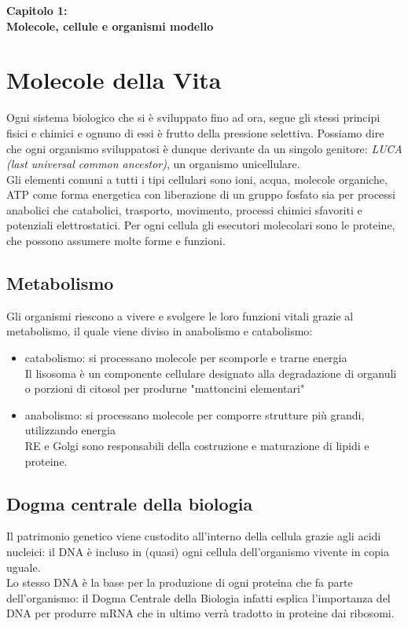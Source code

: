 \Huge\textbf{Capitolo 1: \\Molecole, cellule e organismi modello}


\section{Molecole della Vita}
    \small
    Ogni sistema biologico che si è sviluppato fino ad ora, segue gli stessi principi fisici e chimici e ognuno di essi è frutto della pressione selettiva. 
    Possiamo dire che ogni organismo sviluppatosi è dunque derivante da un singolo genitore: \textit{LUCA (last universal common ancestor)}, un organismo unicellulare.\\
    Gli elementi comuni a tutti i tipi cellulari sono ioni, acqua, molecole organiche, ATP come forma energetica con liberazione di un gruppo fosfato sia per processi anabolici che catabolici, trasporto, movimento, processi chimici sfavoriti e potenziali elettrostatici.
    Per ogni cellula gli esecutori molecolari sono le proteine, che possono assumere molte forme e funzioni. 
    \subsection{Metabolismo}
        \small
        Gli organismi riescono a vivere e svolgere le loro funzioni vitali grazie al metabolismo, il quale viene diviso in anabolismo e catabolismo:
        \begin{itemize}
            \item catabolismo: si processano molecole per scomporle e trarne energia\\
            Il lisosoma è un componente cellulare designato alla degradazione di organuli o porzioni di citosol per produrne "mattoncini elementari"
            \item anabolismo: si processano molecole per comporre strutture più grandi, utilizzando energia\\
            RE e Golgi sono responsabili della costruzione e maturazione di lipidi e proteine.
        \end{itemize}
    
    \subsection{Dogma centrale della biologia}
        \small
        Il patrimonio genetico viene custodito all'interno della cellula grazie agli acidi nucleici: il DNA è incluso in (quasi) ogni cellula dell'organismo vivente in copia uguale. \\
        Lo stesso DNA è la base per la produzione di ogni proteina che fa parte dell'organismo: il Dogma Centrale della Biologia infatti esplica l'importanza del DNA per produrre mRNA che in ultimo verrà tradotto in proteine dai ribosomi.
    
